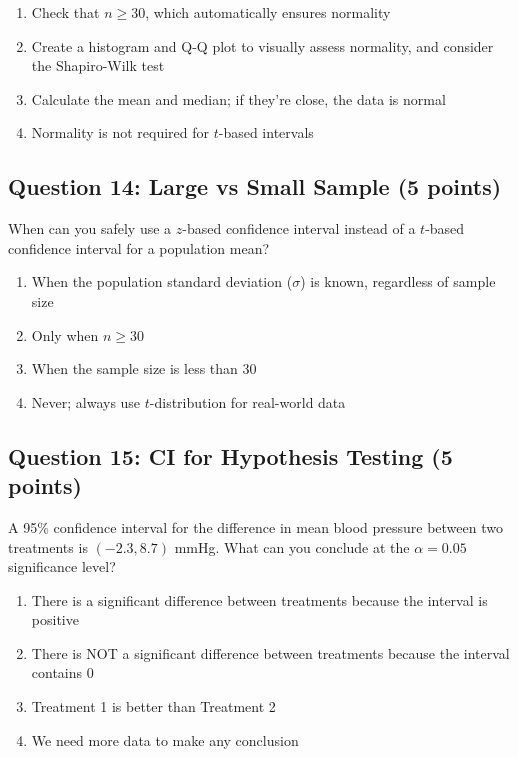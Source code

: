 \documentclass[11pt]{article}
\begin{document}
\begin{enumerate}[label=\alph*)]
\item Check that $n \geq 30$, which automatically ensures normality
\item Create a histogram and Q-Q plot to visually assess normality, and consider the Shapiro-Wilk test
\item Calculate the mean and median; if they're close, the data is normal
\item Normality is not required for $t$-based intervals
\end{enumerate}

\subsection*{Question 14: Large vs Small Sample (5 points)}

When can you safely use a $z$-based confidence interval instead of a $t$-based confidence interval for a population mean?

\begin{enumerate}[label=\alph*)]
\item When the population standard deviation ($\sigma$) is known, regardless of sample size
\item Only when $n \geq 30$
\item When the sample size is less than 30
\item Never; always use $t$-distribution for real-world data
\end{enumerate}

\subsection*{Question 15: CI for Hypothesis Testing (5 points)}

A 95\% confidence interval for the difference in mean blood pressure between two treatments is $(-2.3, 8.7)$ mmHg. What can you conclude at the $\alpha = 0.05$ significance level?

\begin{enumerate}[label=\alph*)]
\item There is a significant difference between treatments because the interval is positive
\item There is NOT a significant difference between treatments because the interval contains 0
\item Treatment 1 is better than Treatment 2
\item We need more data to make any conclusion
\end{enumerate}
\end{document}
